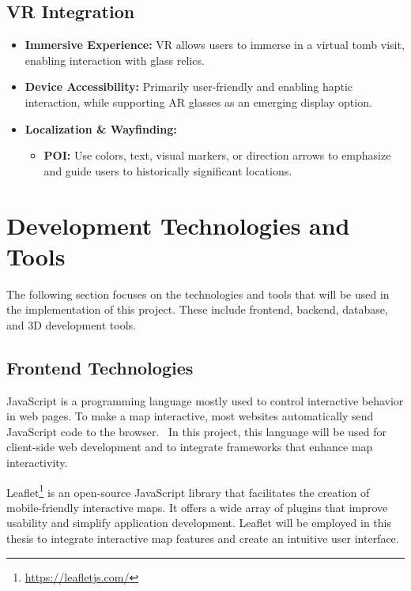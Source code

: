 \subsection*{\gls{VR} Integration}
\begin{itemize}
    \item \textbf{Immersive Experience:} \gls{VR} allows users to immerse in a virtual tomb visit, enabling interaction with glass relics.
    \item \textbf{Device Accessibility:} Primarily user-friendly and enabling haptic interaction, while supporting \gls{AR} glasses as an emerging display option.
    \item \textbf{Localization \& Wayfinding:} 
    \begin{itemize}
        \item \textbf{\gls{POI}:} Use colors, text, visual markers, or direction arrows to emphasize and guide users to historically significant locations.
    \end{itemize}
\end{itemize}



\section{Development Technologies and Tools}
\label{sec:technologies}

The following section focuses on the technologies and tools that will be used in the implementation of this project. These include frontend, backend, database, and \gls{3D} development tools.

\subsection{Frontend Technologies}
\label{sec:frontend}

JavaScript is a programming language mostly used to control interactive behavior in web
pages. To make a map interactive, most websites automatically send JavaScript code to the browser.~\cite{ajayi2024utilizing} In this project, this language will be used for client-side web development and to integrate frameworks that enhance map interactivity.

Leaflet\footnote{\url{https://leafletjs.com/}} is an open-source JavaScript library that facilitates the creation of mobile-friendly interactive maps. It offers a wide array of plugins that improve usability and simplify application development.
Leaflet will be employed in this thesis to integrate interactive map features and create an intuitive user interface.

